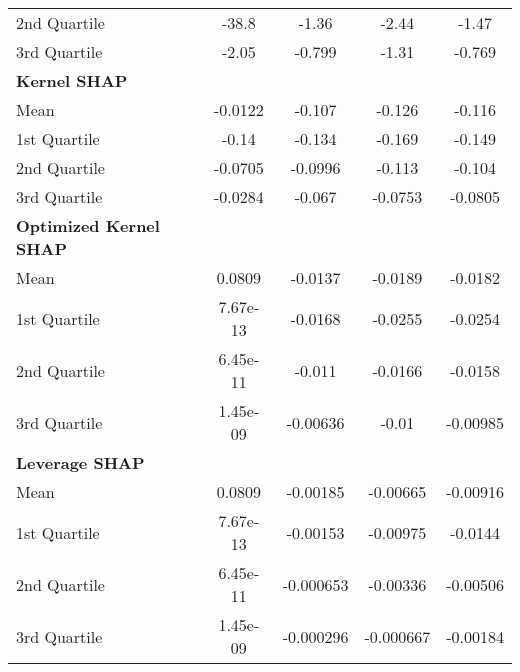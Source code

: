 {\begin{tabular} {lcccc}
\hspace{7pt}2nd Quartile & \cellcolor{silver!60}-38.8 & \cellcolor{silver!60}-1.36 & \cellcolor{gold!60}-2.44 & \cellcolor{silver!60}-1.47 \\ 
\hspace{7pt}3rd Quartile & \cellcolor{gold!60}-2.05 & \cellcolor{silver!60}-0.799 & \cellcolor{silver!60}-1.31 & \cellcolor{silver!60}-0.769 \\ 
\addlinespace[1ex] 
\textbf{Kernel SHAP} &  &  &  &  \\ 
\hspace{7pt}Mean & \cellcolor{bronze!60}-0.0122 & -0.107 & -0.126 & -0.116 \\ 
\hspace{7pt}1st Quartile & \cellcolor{bronze!60}-0.14 & -0.134 & -0.169 & -0.149 \\ 
\hspace{7pt}2nd Quartile & \cellcolor{bronze!60}-0.0705 & -0.0996 & -0.113 & -0.104 \\ 
\hspace{7pt}3rd Quartile & \cellcolor{bronze!60}-0.0284 & -0.067 & -0.0753 & -0.0805 \\ 
\addlinespace[1ex] 
\textbf{Optimized Kernel SHAP} &  &  &  &  \\ 
\hspace{7pt}Mean & 0.0809 & -0.0137 & -0.0189 & -0.0182 \\ 
\hspace{7pt}1st Quartile & 7.67e-13 & -0.0168 & -0.0255 & -0.0254 \\ 
\hspace{7pt}2nd Quartile & 6.45e-11 & -0.011 & -0.0166 & -0.0158 \\ 
\hspace{7pt}3rd Quartile & 1.45e-09 & -0.00636 & -0.01 & -0.00985 \\ 
\addlinespace[1ex] 
\textbf{Leverage SHAP} &  &  &  &  \\ 
\hspace{7pt}Mean & 0.0809 & -0.00185 & -0.00665 & -0.00916 \\ 
\hspace{7pt}1st Quartile & 7.67e-13 & -0.00153 & -0.00975 & -0.0144 \\ 
\hspace{7pt}2nd Quartile & 6.45e-11 & -0.000653 & -0.00336 & -0.00506 \\ 
\hspace{7pt}3rd Quartile & 1.45e-09 & -0.000296 & -0.000667 & -0.00184 \\ 

\end{tabular}}
